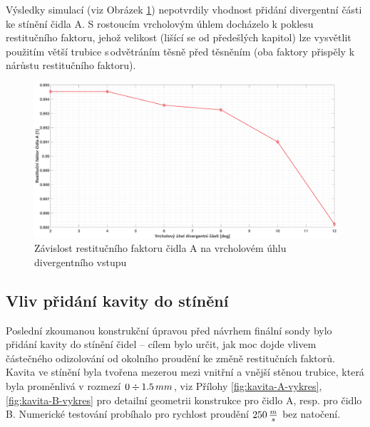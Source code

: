         Výsledky simulací (viz Obrázek \ref{fig:divergentni-cast-A}) nepotvrdily vhodnost přidání divergentní části ke stínění čidla A. S rostoucím vrcholovým úhlem docházelo k poklesu restitučního faktoru, jehož velikost (lišící se od předešlých kapitol) lze vysvětlit použitím větší trubice s\,odvětráním těsně před těsněním (oba faktory přispěly k nárůstu restitučního faktoru).
    
        \begin{figure}[ht!]
            \centering
            \includegraphics*[width=\textwidth]{400_SIMULACE_KONSTRUKCNICH_UPRAV/Grafy/08_divergentni_cast_A.eps}
            \caption{Závislost restitučního faktoru čidla A na vrcholovém úhlu divergentního vstupu}
            \label{fig:divergentni-cast-A}
        \end{figure}
    
    \newpage
    \subsection{Vliv přidání kavity do stínění} \label{sec:kavita}
        Poslední zkoumanou konstrukční úpravou před návrhem finální sondy bylo přidání kavity do stínění čidel – cílem bylo určit, jak moc dojde vlivem částečného odizolování od okolního proudění ke změně restitučních faktorů. Kavita ve stínění byla tvořena mezerou mezi vnitřní a vnější stěnou trubice, která byla proměnlivá v rozmezí \linebreak $0 \div 1.5 \, mm$, viz Přílohy \ref{fig:kavita-A-vykres}, \ref{fig:kavita-B-vykres} pro detailní geometrii konstrukce pro čidlo A, resp. pro čidlo B. Numerické testování probíhalo pro rychlost proudění $250 \, \frac{m}{s}$ bez natočení.

